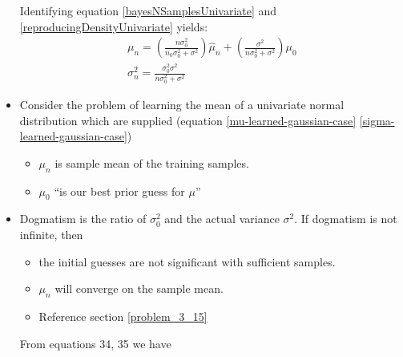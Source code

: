\documentclass[11pt]{article}
\begin{document}
\begin{itemize}
	Identifying equation \ref{bayesNSamplesUnivariate} and \ref{reproducingDensityUnivariate} yields:
	\begin{eqnarray}
		\mu _n = ( \frac{n \sigma_0^2}  {n_0 \sigma_0 ^2 + \sigma^2}  ) \hat{\mu}_n + (\frac{\sigma^2} {n \sigma_0 ^2 + \sigma^2}) \mu_0  \label{mu-learned-gaussian-case}\\
		\sigma_n ^2 = \frac{\sigma_0 ^2 \sigma^2} {n \sigma_0 ^2 + \sigma^2} \label{sigma-learned-gaussian-case}
	\end{eqnarray}
	\item Consider the problem of learning the mean of a univariate normal distribution which are supplied (equation \ref{mu-learned-gaussian-case} \ref{sigma-learned-gaussian-case}\cite[94]{duda-hart-stork})  
	\begin{itemize}
		\item $\mu_n$ is sample mean of the training samples.  
		\item $\mu_0 $ ``is our best prior guess for $\mu$''
	\end{itemize}
	\item Dogmatism is the ratio of $\sigma_0 ^2$ and the actual variance $\sigma^2$.
	If dogmatism is not infinite, then
	\begin{itemize}
		\item  the initial guesses are not significant with sufficient samples.
		\item  $\mu_n$ will converge on the sample mean.
		\item Reference section \ref{problem_3_15}
	\end{itemize}
	From equations 34, 35 we have 



\end{itemize}
\end{document}

